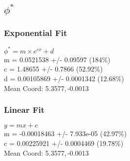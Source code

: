 \documentclass{article}
\begin{document}
	\newpage
	\subsection{$\phi^{*}$}
		\subsubsection{Exponential Fit}
			\begin{minipage}[h]{0.6\textwidth}
					\begin{center}
						\begingroup{}
			  			\resizebox{\textwidth}{!}{%
							
			  			}\endgroup
					\end{center}
			\end{minipage}
			\begin{minipage}[h]{0.35\textwidth}
				$\phi^* = m\times e^{c x} + d$ \\
				m               = 0.0521538        +/- 0.09597      (184\%)\\
				c               = 1.48655          +/- 0.7866       (52.92\%)\\
				d               = 0.00105869       +/- 0.0001342    (12.68\%)\\

				Mean Coord: 5.3577,\,-0.0013
			\end{minipage}

		\subsubsection{Linear Fit}
			\begin{minipage}[h]{0.6\textwidth}
					\begin{center}
						\begingroup{}
			  			\resizebox{\textwidth}{!}{%
							
			  			}\endgroup
					\end{center}
			\end{minipage}
			\begin{minipage}[h]{0.35\textwidth}
				$y=mx + c$ \\
				m               = -0.00018463     +/- 7.933e-05    (42.97\%) \\
				c               = 0.00225921       +/- 0.0004469    (19.78\%) \\

				Mean Coord: 5.3577,\,-0.0013
			\end{minipage}
\end{document}
